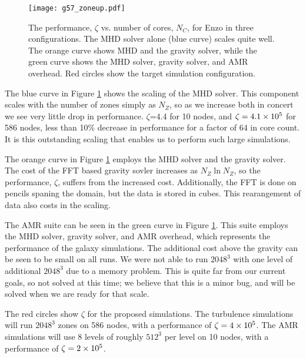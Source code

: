 
\begin{figure} \begin{center}
\texttt{[image: g57\_zoneup.pdf]}
\caption[ ]{The performance, $\zeta$ vs. number of cores, $N_C$,  for Enzo in
three configurations.  The MHD solver alone (blue curve) scales quite well.  The
orange curve shows MHD and the gravity solver, while the green curve shows the
MHD solver, gravity solver, and AMR overhead. Red circles show the target
simulation configuration.}
\label{fig} \end{center} \end{figure}

The blue curve in Figure \ref{fig} shows the scaling of the MHD solver.  This
component scales with the number of zones simply as $N_Z$, so as we increase
both in concert we see very little drop in performance.
 $\zeta$=4.4 for 10 nodes, and $\zeta=4.1\times {10^{5}}$ for 586 nodes, less
than 10\% decrease in performance for a factor of 64 in core count.  It is this
outstanding scaling that enables us to perform such large simulations.

The orange curve in Figure \ref{fig} employs the MHD solver and the gravity
solver.  The cost of the FFT based gravity sovler increases as $N_Z \ln N_Z$, so the
performance, $\zeta$, suffers from the increased cost.  Additionally, the FFT is
done on pencils spaning the domain, but the data is stored in cubes.  This
rearangement of data also costs in the scaling.  

The AMR suite can be seen in the green curve in Figure \ref{fig}.  This suite
employs the MHD solver, gravity solver, and AMR overhead, which represents the
performance of the galaxy simulations.  The additional cost above the gravity can be
seen to be small on all runs.  
We were not able to run $2048^3$ with one level of
additional $2048^3$ due to a memory problem.
This is quite far from our current goals, so not solved at this time; we believe
that this is a minor bug, and will be solved when we are ready for that scale.

The red circles show $\zeta$ for the proposed simulations.  The turbulence
simulations will run $2048^3$ zones on 586 nodes, with a performance of
$\zeta=4\times {10^{5}}$.  
The AMR simulations will use 8 levels of roughly $512^3$ per level on 10 nodes,
with a performance of $\zeta=2\times {10^{5}}$.  





